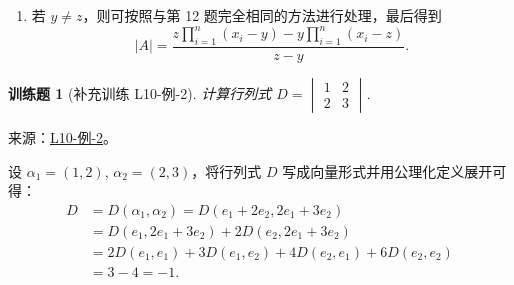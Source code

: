 \documentclass[12pt,fontset=fandol]{ctexart}
\newtheorem{exercise}{训练题}[section]
\begin{document}
\begin{solve}
\begin{enumerate}
\begin{enumerate}
\begin{align*}
\begin{vmatrix}
                                        0                                & 0      & x_2-y  & 0      & \cdots & 0      \\
                                        0                                & 0      & 0      & x_3-y  & \cdots & 0      \\
                                        \vdots                           & \vdots & \vdots & \vdots & \ddots & \vdots \\
                                        0                                & 0      & 0      & 0      & \cdots & x_n-y
                                    \end{vmatrix} \\
                                    &= \prod_{j=1}^n (x_j - y) + y\sum_{i=1}^n \prod_{j \neq i} (x_j - y).
                                \end{align*}
                    \end{enumerate}
                    综上，当 $y = z$ 时，
                    \[
                        |A| = \prod_{j=1}^n (x_j - y) + y\sum_{i=1}^n \prod_{j \neq i} (x_j - y).
                    \]

                \item 若 $y \neq z$，则可按照与第 12 题完全相同的方法进行处理，最后得到
                    \[
                        |A| = \frac{z \prod_{i=1}^n (x_i - y) - y \prod_{i=1}^n (x_i - z)}{z - y}.
                    \]
            \end{enumerate}
\end{solve}

\begin{exercise}[补充训练 L10-例-2]\label{prob:L10-例-2}
计算行列式 $D = \begin{vmatrix}
        1 & 2 \\
        2 & 3
    \end{vmatrix}$.
\end{exercise}
\noindent 来源：\href{https://github.com/yhwu-is/Linear-Algebra-Left-Undone/blob/new/%E8%AE%B2%E4%B9%89/%E4%B8%93%E9%A2%98/10%20%E8%A1%8C%E5%88%97%E5%BC%8F.tex}{L10-例-2}。
\begin{solve}
设 $\alpha_1 = (1, 2)$, $\alpha_2 = (2, 3)$，将行列式 $D$ 写成向量形式并用公理化定义展开可得：
    \begin{align*}
        D &= D(\alpha_1, \alpha_2) = D(e_1 + 2e_2, 2e_1 + 3e_2) \\
          &= D(e_1, 2e_1 + 3e_2) + 2 D(e_2, 2e_1 + 3e_2) \\
          &= 2D(e_1, e_1) + 3D(e_1, e_2) + 4D(e_2, e_1) + 6D(e_2, e_2) \\
          &= 3 - 4 = -1.
    \end{align*}
\end{solve}
\end{document}
